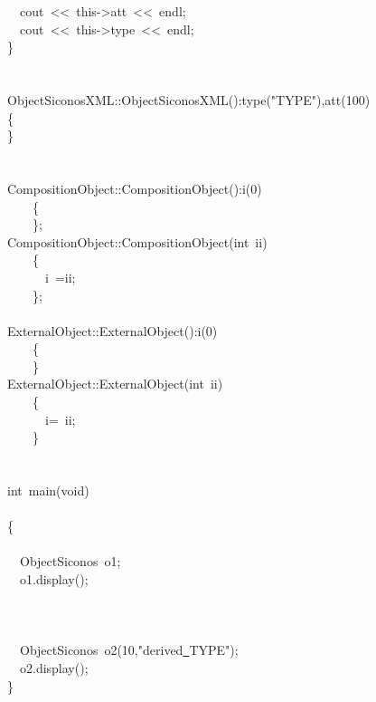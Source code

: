 {\ \ cout\ <{}<{}\ this-{}>{}att\ <{}<{}\ endl;\\
\ \ cout\ <{}<{}\ this-{}>{}type\ <{}<{}\ endl;\\
\}\\
\ \\
\ \\
ObjectSiconosXML::ObjectSiconosXML():type("{}TYPE"{}),att(100)\\
\{\\
\}\\
\ \\
\ \\
CompositionObject::CompositionObject():i(0)\\
\ \ \ \ \{\\
\ \ \ \ \};\\
CompositionObject::CompositionObject(int\ ii)\\
\ \ \ \ \{\\
\ \ \ \ \ \ i\ =ii;\\
\ \ \ \ \};\\
\ \\
ExternalObject::ExternalObject():i(0)\\
\ \ \ \ \{\\
\ \ \ \ \}\\
ExternalObject::ExternalObject(int\ ii)\\
\ \ \ \ \{\\
\ \ \ \ \ \ i=\ ii;\\
\ \ \ \ \}\\
\ \\
\ \\
int\ main(void)\\
\ \\
\{\\
\ \\
\ \ ObjectSiconos\ o1;\\
\ \ o1.display();\\
\ \ \\
\ \\
\ \\
\ \ ObjectSiconos\ o2(10,"{}derived\underline\ TYPE"{});\\
\ \ o2.display();\\
\}\\
\ \\
 }
\normalfont\normalsize

